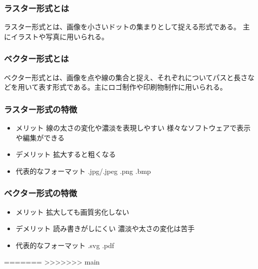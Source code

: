 \documentclass{ltjsarticle}
\begin{document}
\subsubsection{ラスター形式とは}
ラスター形式とは、画像を小さいドットの集まりとして捉える形式である。
主にイラストや写真に用いられる。
\subsubsection{ベクター形式とは}
ベクター形式とは、画像を点や線の集合と捉え、それぞれについてパスと長さなどを用いて表す形式である。主にロゴ制作や印刷物制作に用いられる。
\subsubsection{ラスター形式の特徴}
\begin{itemize}
    \item メリット
	\subitem 線の太さの変化や濃淡を表現しやすい
	\subitem 様々なソフトウェアで表示や編集ができる
    \item デメリット
	\subitem 拡大すると粗くなる
    \item 代表的なフォーマット
	\subitem .jpg/.jpeg
	\subitem .png
	\subitem .bmp
\end{itemize}
\subsubsection{ベクター形式の特徴}
\begin{itemize}
    \item メリット
	\subitem 拡大しても画質劣化しない
    \item デメリット
	\subitem 読み書きがしにくい
	\subitem 濃淡や太さの変化は苦手
    \item 代表的なフォーマット
	\subitem .svg
	\subitem .pdf
\end{itemize}
=======
>>>>>>> main
\end{document}
